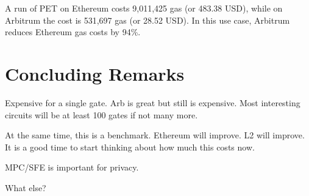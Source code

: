 A run of PET on Ethereum costs 9,011,425 gas (or 483.38 USD), while on Arbitrum the cost is 531,697 gas (or 28.52 USD). In this use case, Arbitrum reduces Ethereum gas costs by 94\%.  


\section{Concluding Remarks}

\begin{compactlist}
\item Expensive for a single gate. Arb is great but still is expensive. Most interesting circuits will be at least 100 gates if not many more.
\item At the same time, this is a benchmark. Ethereum will improve. L2 will improve. It is a good time to start thinking about how much this costs now. 
\item MPC/SFE is important for privacy.
\item What else?
\end{compactlist}
